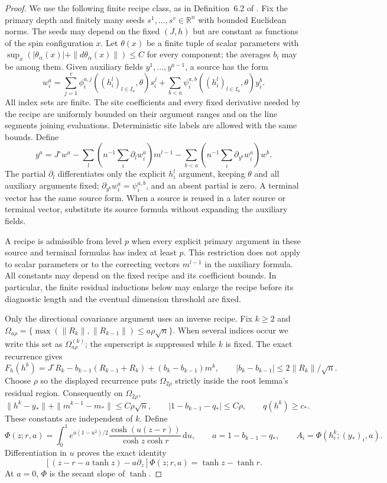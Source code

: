 \begin{proof}
We use the following finite recipe class, as in Definition~6.2 of
\cite{AcceptedGap}. Fix the primary depth and finitely many seeds
$s^1,\ldots,s^v\in\mathbb R^n$ with bounded Euclidean norms.
The seeds may depend on the fixed $(J,h)$ but are constant as functions
of the spin configuration $x$. Let $\theta(x)$ be a finite tuple of
scalar parameters with
$\sup_x(|\theta_\alpha(x)|+\|d\theta_\alpha(x)\|)\le C$
for every component; the averages $b_l$ may be among them.
Given auxiliary fields $y^1,\ldots,y^{a-1}$, a source has the form
\[
 w_i^a=\sum_{j=1}^v
   \phi_i^{a,j}((h_i^l)_{l\in I_a},\theta)s_i^j
 +\sum_{b<a}\psi_i^{a,b}((h_i^l)_{l\in I_a},\theta)y_i^b.
\]
All index sets are finite. The site coefficients and every fixed
derivative needed by the recipe are uniformly bounded on their argument
ranges and on the line segments joining evaluations. Deterministic
site labels are allowed with the same bounds. Define
\[
 y^a=J^\circ w^a
 -\sum_l\left(n^{-1}\sum_i\partial_lw_i^a\right)m^{l-1}
 -\sum_{b<a}\left(n^{-1}\sum_i\partial_{y^b}w_i^a\right)w^b.
\]
The partial $\partial_l$ differentiates only the explicit $h_i^l$
argument, keeping $\theta$ and all auxiliary arguments fixed;
$\partial_{y^b}w_i^a=\psi_i^{a,b}$, and an absent partial is zero.
A terminal vector has the same source form. When a source is reused
in a later source or terminal vector, substitute its source formula
without expanding the auxiliary fields.

A recipe is admissible from level $p$ when every explicit primary
argument in these source and terminal formulas has index at least $p$.
This restriction does not apply to scalar parameters or to the
correcting vectors $m^{l-1}$ in the auxiliary formula. All constants
may depend on the fixed recipe and its coefficient bounds. In particular,
the finite residual inductions below may enlarge the recipe before its
diagnostic length and the eventual dimension threshold are fixed.

Only the directional covariance argument uses an inverse recipe.
Fix $k\ge2$ and
$\Omega_{a\rho}=\{\max(\|R_k\|,\|R_{k-1}\|)\le a\rho\sqrt n\}$.
When several indices occur we write this set as
\(\Omega_{a\rho}^{(k)}\); the superscript is suppressed while
\(k\) is fixed.
The exact recurrence gives
\[
 F_h(h^k)=J^\circ R_k-b_{k-1}(R_{k-1}+R_k)
                  +(b_k-b_{k-1})m^k,
 \qquad |b_k-b_{k-1}|\le2\|R_k\|/\sqrt n.
\]
Choose \(\rho\) so the displayed recurrence puts
\(\Omega_{2\rho}\) strictly inside the root lemma's residual
region. Consequently on $\Omega_{2\rho}$,
\[
 \|h^k-y_*\|+\|m^{k-1}-m_*\|\le C\rho\sqrt n,
 \qquad |1-b_{k-1}-q_*|\le C\rho,
 \qquad q(h^k)\ge c_*.
\]
These constants are independent of $k$.  Define
\[
 \Phi(z;r,a)=\int_0^1e^{a(1-u^2)/2}
        \frac{\cosh(u(z-r))}{\cosh z\cosh r}\,\mathrm du,
 \qquad a=1-b_{k-1}-q_*,\qquad A_i=\Phi(h_i^k;(y_*)_i,a).
\]
Differentiation in $u$ proves the exact identity
\[
 [(z-r-a\tanh z)-a\partial_z]\Phi(z;r,a)=\tanh z-\tanh r.
\]
At $a=0$, $\Phi$ is the secant slope of $\tanh$.


\end{proof}
